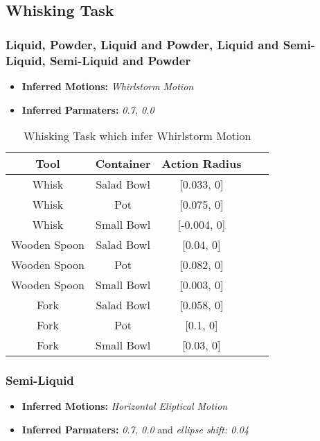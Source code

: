 \subsection{Whisking Task}
\subsubsection{Liquid, Powder, Liquid and Powder, Liquid and Semi-Liquid, Semi-Liquid and Powder}
\begin{itemize}
    \item \textbf{Inferred Motions:} \textit{Whirlstorm Motion}
    \item \textbf{Inferred Parmaters:} \textit{0.7, 0.0}
\end{itemize}
\begin{table}[H]
    \centering
    \begin{tabular}{|c|c|c|c|c|}
      \hline
      \textbf{Tool} & \textbf{Container} & \textbf{Action Radius}\\
      \hline
      Whisk & Salad Bowl & [0.033, 0] \\
      \hline
      Whisk & Pot & [0.075, 0] \\
      \hline
      Whisk & Small Bowl & [-0.004, 0]\\
      \hline
      Wooden Spoon & Salad Bowl & [0.04, 0] \\
      \hline
      Wooden Spoon & Pot & [0.082, 0] \\
      \hline
      Wooden Spoon & Small Bowl & [0.003, 0] \\
      \hline
      Fork & Salad Bowl & [0.058, 0] \\
      \hline
      Fork & Pot & [0.1, 0] \\
      \hline
      Fork & Small Bowl & [0.03, 0] \\
      \hline
    \end{tabular}
    \caption{Whisking Task which infer Whirlstorm Motion}
    
  \end{table}

  \subsubsection*{Semi-Liquid}
  \begin{itemize}
      \item \textbf{Inferred Motions:} \textit{Horizontal Eliptical Motion}
      \item \textbf{Inferred Parmaters:} \textit{0.7, 0.0} and \textit{ellipse shift: 0.04}
  \end{itemize}
    
